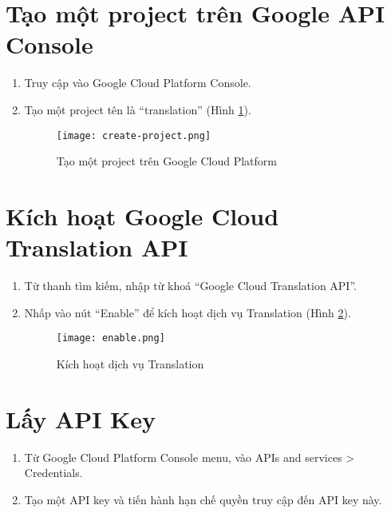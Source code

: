 \documentclass[../thesis.tex]{subfiles}
\begin{document}
\section{Tạo một project trên Google API Console}
\begin{enumerate}
	\item Truy cập vào Google Cloud Platform Console.
	\item Tạo một project tên là ``translation'' (Hình \ref{Tao mot project tren Google Cloud Platform}).
	\begin{figure}
		\texttt{[image: create-project.png]}
		\caption{Tạo một project trên Google Cloud Platform}
		\label{Tao mot project tren Google Cloud Platform}
	\end{figure}
\end{enumerate}

\section{Kích hoạt Google Cloud Translation API}
\begin{enumerate}
	\item Từ thanh tìm kiếm, nhập từ khoá ``Google Cloud Translation API''.
	\item Nhấp vào nút ``Enable'' để kích hoạt dịch vụ Translation (Hình \ref{Kich hoat dich vu Translation}).
	\begin{figure}
		\texttt{[image: enable.png]}
		\caption{Kích hoạt dịch vụ Translation}
		\label{Kich hoat dich vu Translation}
	\end{figure}
\end{enumerate}

\section{Lấy API Key}
\begin{enumerate}
	\item Từ Google Cloud Platform Console menu, vào APIs and services > Credentials.
	\item Tạo một API key và tiến hành hạn chế quyền truy cập đến API key này.
\end{enumerate}
\end{document}
